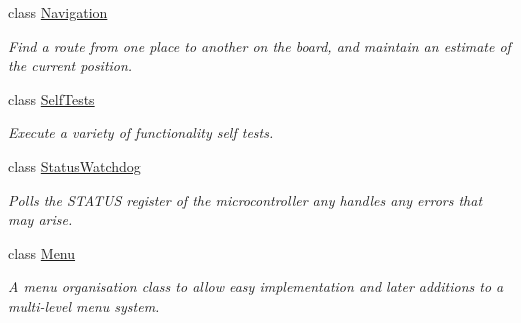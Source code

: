 \begin{DoxyCompactItemize}
class \hyperlink{classIDP_1_1Navigation}{Navigation}
\begin{DoxyCompactList}\small\item\em Find a route from one place to another on the board, and maintain an estimate of the current position. \item\end{DoxyCompactList}\item 
class \hyperlink{classIDP_1_1SelfTests}{SelfTests}
\begin{DoxyCompactList}\small\item\em Execute a variety of functionality self tests. \item\end{DoxyCompactList}\item 
class \hyperlink{classIDP_1_1StatusWatchdog}{StatusWatchdog}
\begin{DoxyCompactList}\small\item\em Polls the STATUS register of the microcontroller any handles any errors that may arise. \item\end{DoxyCompactList}\item 
class \hyperlink{classIDP_1_1Menu}{Menu}
\begin{DoxyCompactList}\small\item\em A menu organisation class to allow easy implementation and later additions to a multi-\/level menu system. \item\end{DoxyCompactList}\end{DoxyCompactItemize}
